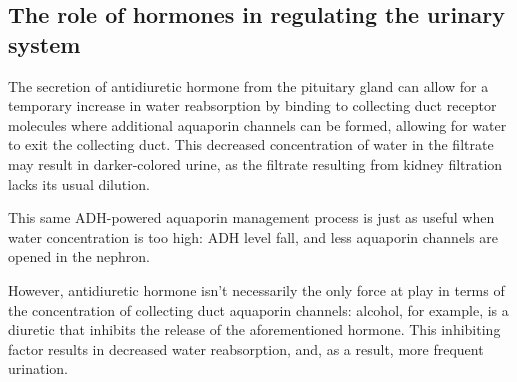 \documentclass{article}
\begin{document}
\subsection{The role of hormones in regulating the urinary system}

The secretion of antidiuretic hormone from the pituitary gland can allow for a
temporary increase in water reabsorption by binding to collecting duct receptor
molecules where additional aquaporin channels can be formed, allowing for water
to exit the collecting duct. This decreased concentration of water in the
filtrate may result in darker-colored urine, as the filtrate resulting from
kidney filtration lacks its usual dilution.

This same ADH-powered aquaporin management process is just as useful when water
concentration is too high: ADH level fall, and less aquaporin channels are
opened in the nephron.

However, antidiuretic hormone isn't necessarily the only force at play in terms
of the concentration of collecting duct aquaporin channels: alcohol, for example,
is a diuretic that inhibits the release of the aforementioned hormone. This
inhibiting factor results in decreased water reabsorption, and, as a result,
more frequent urination.
\end{document}
